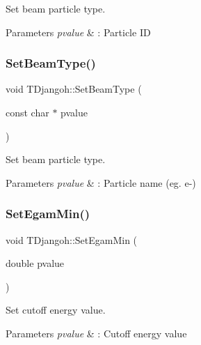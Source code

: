 Set beam particle type. 


\begin{DoxyParams}{Parameters}
{\em pvalue} & \+: Particle ID \\
\hline
\end{DoxyParams}
\mbox{\label{class_t_djangoh_a37c2f8994175d3181a7f6f5aae5797f1}} 
\subsubsection{\texorpdfstring{Set\+Beam\+Type()}{SetBeamType()}\hspace{0.1cm}{\footnotesize\ttfamily [2/2]}}
{\footnotesize\ttfamily void T\+Djangoh\+::\+Set\+Beam\+Type (\begin{DoxyParamCaption}\item[{const char $\ast$}]{pvalue }\end{DoxyParamCaption})}



Set beam particle type. 


\begin{DoxyParams}{Parameters}
{\em pvalue} & \+: Particle name (eg. e-\/) \\
\hline
\end{DoxyParams}
\mbox{\label{class_t_djangoh_ac296a00fee7971d387aa5127f726a649}} 
\subsubsection{\texorpdfstring{Set\+Egam\+Min()}{SetEgamMin()}}
{\footnotesize\ttfamily void T\+Djangoh\+::\+Set\+Egam\+Min (\begin{DoxyParamCaption}\item[{double}]{pvalue }\end{DoxyParamCaption})}



Set cutoff energy value. 


\begin{DoxyParams}{Parameters}
{\em pvalue} & \+: Cutoff energy value \\
\hline
\end{DoxyParams}
\mbox{\label{class_t_djangoh_abbbe8452bf4a894e8757e096fb104d90}} 
